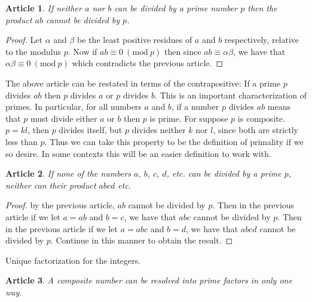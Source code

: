 \documentclass{article}
\theoremstyle{problemstyle}
\newtheorem{article}{Article}
\newcommand{\Mod}[1]{\ (\mathrm{mod}\ #1)}
\begin{document}
\begin{article}
If neither $a$ nor $b$ can be divided by a prime number $p$ then the product $ab$ cannot be divided by $p$.
\end{article}

\begin{proof}
Let $\alpha$ and $\beta$ be the least positive residues of $a$ and $b$ respectively, relative to the modulus $p$. Now if $ab \equiv 0 \Mod{p}$ then since $ab \equiv \alpha \beta$, we have that $\alpha \beta \equiv 0 \Mod{p}$ which contradicts the previous article. 
\end{proof}

The above article can be restated in terms of the contrapositive: If a prime $p$ divides $ab$ then $p$ divides $a$ or $p$ divides $b$. This is an important characterization of primes. In particular, for all numbers $a$ and $b$, if a number $p$ divides $ab$ means that $p$ must divide either $a$ or $b$ then $p$ is prime. For suppose $p$ is composite. $p = kl$, then $p$ divides itself, but $p$ divides neither $k$ nor $l$, since both are strictly less than $p$.  Thus we can take this property to be the definition of primality if we so desire. In some contexts this will be an easier definition to work with. 

\begin{article}
If none of the numbers $a$, $b$, $c$, $d$, etc. can be divided by a prime $p$, neither can their product $abcd$ etc. 
\end{article}

\begin{proof}
by the previous article, $ab$ cannot be divided by $p$. Then in the previous article if we let $a = ab$ and $b = c$, we have that $abc$ cannot be divided by $p$. Then in the previous article if we let $a = abc$ and $b = d$, we have that $abcd$ cannot be divided by $p$. Continue in this manner to obtain the result. 
\end{proof}

Unique factorization for the integers. 

\begin{article}
A composite number can be resolved into prime factors in only one way. 
\end{article}
\end{document}
